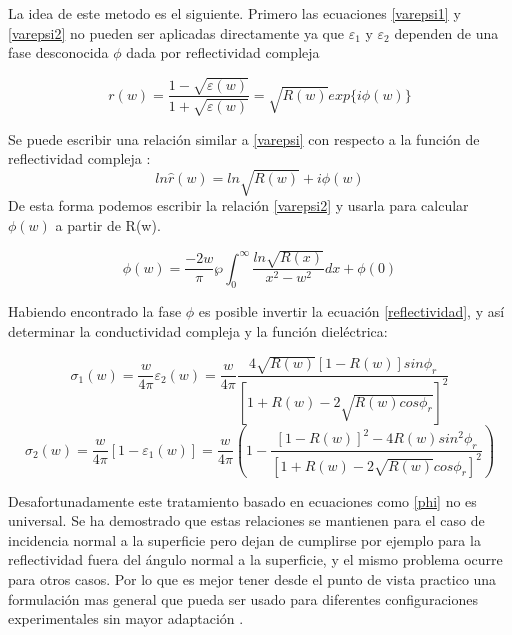 \documentclass[a4paper,openright,12pt]{book}
\begin{document}
La idea de este metodo es el siguiente. Primero las ecuaciones \ref{varepsi1} y \ref{varepsi2} no pueden ser aplicadas directamente ya que $\varepsilon_{1}$  y $\varepsilon_{2}$  dependen de una fase desconocida $\phi$ dada por reflectividad compleja \cite{constrained}
\begin{center}

\begin{equation}\label{reflectividad}
r(w)=\frac{1-\sqrt{\varepsilon(w)}}{1+\sqrt{\varepsilon(w)}}=\sqrt{R(w)}exp\{i\phi(w)\}
\end{equation}

\end{center}
Se puede escribir una relación similar a \ref{varepsi} con respecto a la función de reflectividad compleja \cite{constrained}:
\begin{equation}
ln\hat{r}(w)=ln\sqrt{R(w)}+i\phi(w)
\end{equation}
De esta forma podemos escribir la relación \ref{varepsi2}  y usarla para calcular $\phi(w)$ a partir de R(w).

\begin{equation}\label{phi}
\phi(w)=\frac{-2w}{\pi}\wp\int_{0}^{\infty}\frac{ln\sqrt{R(x)}}{x^{2}-w^{2}}dx+\phi(0)
\end{equation}

Habiendo encontrado la fase $\phi$ es posible invertir la ecuación \ref{reflectividad}, y así determinar la conductividad compleja y la función dieléctrica: \cite{OpticalTechniques}

\begin{equation}
\sigma_{1}(w)=\frac{w}{4\pi}\varepsilon_{2}(w)=\frac{w}{4\pi}\frac{4\sqrt{R(w)}[1-R(w)]sin\phi_{r}}{[1+R(w)-2\sqrt{R(w)cos\phi_{r}}]^{2}}
\end{equation}
\begin{equation}
\sigma_{2}(w)=\frac{w}{4\pi}[1-\varepsilon_{1}(w)]=\frac{w}{4\pi}(1-\frac{[1-R(w)]^{2}-4R(w)sin^{2}\phi_{r}}{[1+R(w)-2\sqrt{R(w)}cos\phi_{r}]^{2}})
\end{equation}

Desafortunadamente este tratamiento basado en ecuaciones como \ref{phi} no es universal. Se ha demostrado que estas relaciones se mantienen para el caso de incidencia normal a la superficie pero dejan de cumplirse por ejemplo para la reflectividad fuera del ángulo normal a la superficie, y el mismo problema ocurre para otros casos. Por lo que es mejor tener desde el punto de vista practico una formulación mas general que pueda ser usado para diferentes configuraciones experimentales sin mayor adaptación \cite{constrained}.
\end{document}
